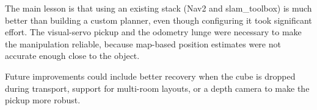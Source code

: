 \documentclass[conference]{IEEEtran}
\begin{document}
The main lesson is that using an existing stack (Nav2 and
slam\_toolbox) is much better than building a custom planner,
even though configuring it took significant effort.
The visual-servo pickup and the odometry lunge were necessary to
make the manipulation reliable, because map-based position estimates
were not accurate enough close to the object.

Future improvements could include better recovery when the cube is
dropped during transport, support for multi-room layouts, or a
depth camera to make the pickup more robust.
\end{document}
